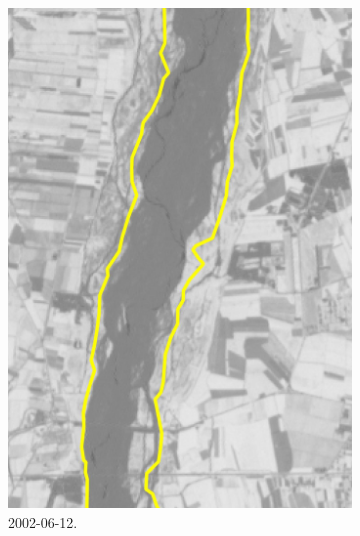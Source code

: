 \begin{description}
\begin{figure}[t]
\begin{subfigure}[b]{0.4\textwidth}
			\includegraphics[width=\textwidth]{files/esempio_mask_2002_06_12.jpeg}
			\caption{\AST{} 2002-06-12.}
		\end{subfigure}
		\qquad
		\begin{subfigure}[b]{0.4\textwidth}

\end{subfigure}
\end{figure}
\end{description}
